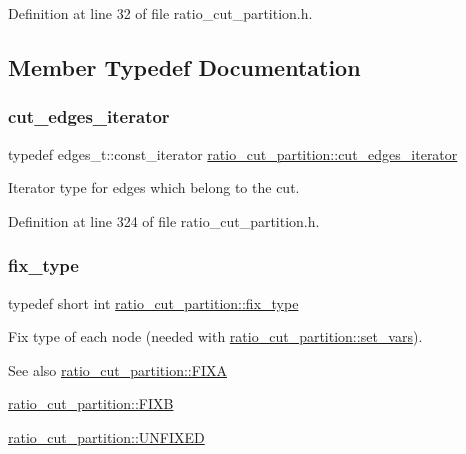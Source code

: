 Definition at line 32 of file ratio\+\_\+cut\+\_\+partition.\+h.



\subsection{Member Typedef Documentation}
\mbox{\label{classratio__cut__partition_a910bb0e5c927ffd26a3805787e179194}} 
\subsubsection{\texorpdfstring{cut\+\_\+edges\+\_\+iterator}{cut\_edges\_iterator}}
{\footnotesize\ttfamily typedef edges\+\_\+t\+::const\+\_\+iterator \mbox{\hyperlink{classratio__cut__partition_a910bb0e5c927ffd26a3805787e179194}{ratio\+\_\+cut\+\_\+partition\+::cut\+\_\+edges\+\_\+iterator}}}

Iterator type for edges which belong to the cut. 

Definition at line 324 of file ratio\+\_\+cut\+\_\+partition.\+h.

\mbox{\label{classratio__cut__partition_a558dda40abda8ab03edb4605dbb81e36}} 
\subsubsection{\texorpdfstring{fix\+\_\+type}{fix\_type}}
{\footnotesize\ttfamily typedef short int \mbox{\hyperlink{classratio__cut__partition_a558dda40abda8ab03edb4605dbb81e36}{ratio\+\_\+cut\+\_\+partition\+::fix\+\_\+type}}}

Fix type of each node (needed with \mbox{\hyperlink{classratio__cut__partition_a4c143f82aac5fee3b955414ab7d6ce19}{ratio\+\_\+cut\+\_\+partition\+::set\+\_\+vars}}).

\begin{DoxySeeAlso}{See also}
\mbox{\hyperlink{classratio__cut__partition_a2fe155c63de19dc08c16bcb382f0dcbc}{ratio\+\_\+cut\+\_\+partition\+::\+F\+I\+XA}} 

\mbox{\hyperlink{classratio__cut__partition_aea621a2460229773cbc095814942963a}{ratio\+\_\+cut\+\_\+partition\+::\+F\+I\+XB}} 

\mbox{\hyperlink{classratio__cut__partition_a153cc7e51ac5d72a00671b6bdbcc6fa5}{ratio\+\_\+cut\+\_\+partition\+::\+U\+N\+F\+I\+X\+ED}} 
\end{DoxySeeAlso}


